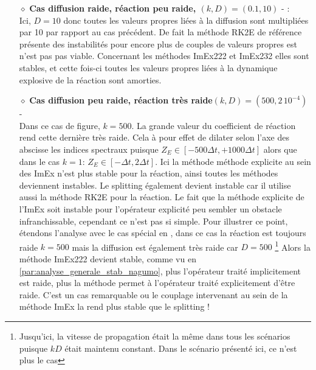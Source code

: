 \begin{itemize}
                    \item[$\diamond$]\textbf{Cas diffusion raide, réaction peu raide, $(k,D)=(0.1,10)$}  - :\\
                        Ici, $D=10$ donc toutes les valeurs propres liées à la diffusion sont multipliées par 10 par rapport au cas précédent. 
                        De fait la méthode RK2E de référence présente des instabilités pour encore plus de couples de valeurs propres est n'est pas pas viable.
                        Concernant les méthodes ImEx222 et ImEx232 elles sont stables, et cette fois-ci toutes les valeurs propres liées à la 
                        dynamique explosive de la réaction sont amorties. 
                    \item[$\diamond$]\textbf{Cas diffusion peu raide, réaction très raide$(k,D)=(500,2\, 10^{-4})$} - \\
                        Dans ce cas de figure, $k=500$. La grande valeur du coefficient de réaction rend cette dernière très raide. 
                        Cela à pour effet de dilater selon l'axe des abscisse les indices spectraux puisque $Z_E \in [- 500 \Delta t, + 1000 \Delta t]$
                        alors que dans le cas $k=1$: $Z_E \in [- \Delta t , 2\Delta t]$.
                        Ici la méthode méthode explicite au sein des ImEx n'est plus stable pour la réaction, ainsi toutes les méthodes deviennent instables. 
                        Le splitting également devient instable car il utilise aussi la méthode RK2E pour la réaction. 
                        Le fait que la méthode explicite de l'ImEx soit instable pour l'opérateur explicité peu sembler un obstacle infranchissable,
                        cependant ce n'est pas si simple.
                        Pour illustrer ce point, étendons l'analyse avec le cas spécial en , dans ce cas la réaction est toujours raide $k=500$ mais la diffusion est également très raide car $D=500$
                        \footnote{Jusqu'ici, la vitesse de propagation était la même dans tous les scénarios puisque $kD$ était maintenu constant. Dans le scénario présenté ici, ce n'est plus le cas}
                        Alors la méthode ImEx222 devient stable, comme vu en \ref{par:analyse_generale_stab_nagumo}, plus l'opérateur traité implicitement est raide, 
                        plus la méthode permet à l'opérateur traité explicitement d'être raide. C'est un cas remarquable ou le couplage intervenant au sein de la méthode ImEx
                        la rend plus stable que le splitting !
                \end{itemize}
